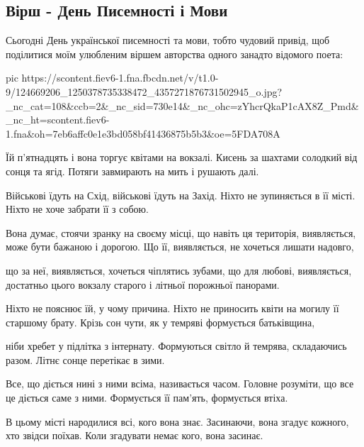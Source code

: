  
 
 

\subsection{Вірш - День Писемності і Мови}
\label{sec:09_11_2020.fb.dmytro_shutaiev.1.virsh}

Сьогодні День української писемності та мови, тобто чудовий привід, щоб
поділитися моїм улюбленим віршем авторства одного занадто відомого поета:

\ifcmt
pic https://scontent.fiev6-1.fna.fbcdn.net/v/t1.0-9/124669206_1250378735338472_4357271876731502945_o.jpg?_nc_cat=108&ccb=2&_nc_sid=730e14&_nc_ohc=zYhcrQkaP1cAX8Z_Pmd&_nc_ht=scontent.fiev6-1.fna&oh=7eb6affc0e1e3bd058bf41436875b5b3&oe=5FDA708A
\fi

\obeycr
Їй п’ятнадцять і вона торгує квітами на вокзалі.
Кисень за шахтами солодкий від сонця та ягід.
Потяги завмирають на мить і рушають далі.

Військові їдуть на Схід, військові їдуть на Захід.
Ніхто не зупиняється в її місті.
Ніхто не хоче забрати її з собою.

Вона думає, стоячи зранку на своєму місці,
що навіть ця територія, виявляється, може бути бажаною і дорогою.
Що її, виявляється, не хочеться лишати надовго,

що за неї, виявляється, хочеться чіплятись зубами,
що для любові, виявляється, достатньо цього вокзалу старого
і літньої порожньої панорами.

Ніхто не пояснює їй, у чому причина.
Ніхто не приносить квіти на могилу її старшому брату.
Крізь сон чути, як у темряві формується батьківщина,

ніби хребет у підлітка з інтернату.
Формуються світло й темрява, складаючись разом.
Літнє сонце перетікає в зими.

Все, що діється нині з ними всіма, називається часом.
Головне розуміти, що все це діється саме з ними.
Формується її пам’ять, формується втіха.

В цьому місті народилися всі, кого вона знає.
Засинаючи, вона згадує кожного, хто звідси поїхав.
Коли згадувати немає кого, вона засинає.
\restorecr

